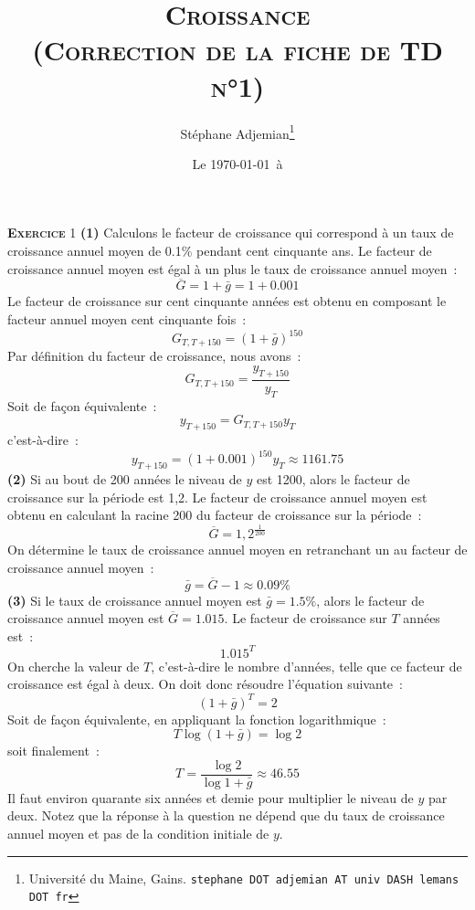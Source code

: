 \documentclass[10pt,a4paper,notitlepage]{report}
\newcommand{\exercice}[1]{\textsc{\textbf{Exercice}} #1}
\newcommand{\question}[1]{\textbf{(#1)}}
\begin{document}
\title{\textsc{Croissance\\ \small{(Correction de la fiche de TD n°1)}}}
\author{Stéphane Adjemian\thanks{Université du Maine, Gains. \texttt{stephane DOT adjemian AT univ DASH lemans DOT fr}}}
\date{Le \today\ à \thistime}

\maketitle



\exercice{1} \question{1} Calculons  le facteur  de
croissance  qui correspond  à un  taux de  croissance annuel  moyen de
0.1\% pendant  cent cinquante  ans.  Le  facteur de  croissance annuel
moyen est égal à un plus le taux de croissance annuel moyen :
\[
\overline{G} = 1 + \bar{g} = 1 + 0.001
\]
Le  facteur de  croissance sur  cent  cinquante années  est obtenu  en
composant le facteur annuel moyen cent cinquante fois :
\[
G_{T,T+150} = (1 + \bar{g})^{150}
\]
Par définition du facteur de croissance, nous avons :
\[
G_{T,T+150} = \frac{y_{T+150}}{y_{T}}
\]
Soit de façon équivalente :
\[
y_{T+150} = G_{T,T+150}y_T
\]
c'est-à-dire :
\[
y_{T+150} = (1+0.001)^{150} y_T \approx 1161.75
\]
\question{2} Si au bout de 200 années le niveau de $y$ est 1200, alors
le  facteur de  croissance  sur  la période  est  1,2.  Le facteur  de
croissance  annuel moyen  est obtenu  en  calculant la  racine 200  du
facteur de croissance sur la période :
\[
\overline{G} = 1,2^{\frac{1}{200}}
\]
On détermine le  taux de croissance annuel moyen en  retranchant un au
facteur de croissance annuel moyen :
\[
\bar{g} = \overline{G}-1 \approx 0.09\%
\]
\question{3}  Si le  taux de  croissance annuel  moyen est  $\bar g  =
1.5\%$, alors le facteur de  croissance annuel moyen est $\overline{G}
= 1.015$. Le facteur de croissance sur $T$ années est :
\[
1.015^T
\]
On cherche  la valeur de  $T$, c'est-à-dire le nombre  d'années, telle
que ce  facteur de croissance est  égal à deux. On  doit donc résoudre
l'équation suivante :
\[
(1+\bar g)^T = 2
\]
Soit de façon équivalente, en appliquant la fonction logarithmique :
\[
T \log (1+\bar g) = \log 2 
\]
soit finalement :
\[
T = \frac{\log 2}{\log 1+\bar g} \approx 46.55
\]
Il faut environ quarante six années et demie pour multiplier le niveau
de $y$ par deux.  Notez que la réponse à la question  ne dépend que du
taux de  croissance annuel moyen  et pas  de la condition  initiale de
$y$.


\bigskip
\bigskip
\end{document}
